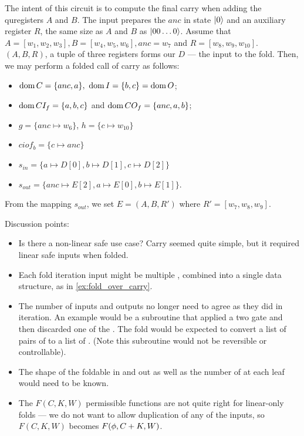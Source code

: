 The intent of this circuit is to compute the final carry when
adding the quregisters $A$ and $B$. The input prepares
the $anc$ in state $\left\vert{0}\right\rangle$ and an auxiliary register $R$,
the same size as $A$ and $B$ as $\left\vert{00\ldots0}\right\rangle$. Assume
that $A = [w_1,w_2,w_3], B=[w_4,w_5,w_6], anc=w_7$ and
$R=[w_8,w_9,w_{10}]$. $(A,B,R)$, a tuple of three registers
forms our $D$ --- the input to the fold. Then,
we may perform a folded call of carry as follows:
\begin{itemize}
  \item $\operatorname*{dom}{C} = \{anc,a\},\ \operatorname*{dom}{I} = \{b,c\} = \operatorname*{dom}{O}$;
  \item $\operatorname*{dom}{CI_f} = \{a,b,c\}$ and $\operatorname*{dom}{CO_f} = \{anc,a,b\}$;
  \item $g = \{anc \mapsto w_{6}\}$, $h=\{c\mapsto w_{10}\}$
  \item $ciof_b = \{c \mapsto anc \}$
  \item $s_{in} = \{a \mapsto D[0], b \mapsto D[1], c \mapsto D[2]\}$
  \item $s_{out} = \{anc \mapsto E[2], a \mapsto E[0], b \mapsto E[1]\}$.
\end{itemize}
From the mapping $s_{out}$, we set $E = (A,B,R')$ where $R'=[w_7,w_8,w_9]$.

Discussion points:
\begin{itemize}
  \item Is there a non-linear safe use case? Carry seemed quite simple,
    but it required linear safe inputs when folded.
  \item Each fold iteration input might be multiple ,
  combined into a single data structure, as in 
    \vref{ex:fold_over_carry}.
  \item The number of inputs and outputs no longer need
    to agree as they did in iteration.  An example would be a subroutine that
    applied a two \qubit gate and then discarded one of the \qubits.
    The fold would be expected to convert a list of pairs  of 
    to a list of . (Note this subroutine would not be reversible
    or controllable).
  \item The shape of the foldable in and out as well as the number of \qubits
    at each leaf would need to be known.
  \item The $F(C,K,W)$ permissible functions are not quite right for
    linear-only folds --- we do not want to allow duplication of any of
    the inputs, so $F(C,K,W)$ becomes $F(\phi,C+K,W)$.
\end{itemize}

